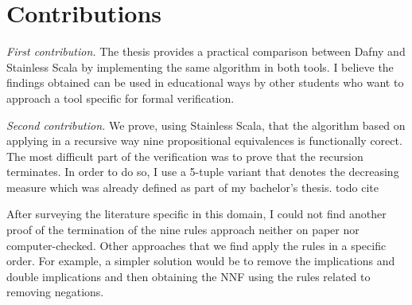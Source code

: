 \chapter*{Contributions} 

\emph{First contribution.} The thesis provides a practical comparison between Dafny and Stainless Scala
by implementing the same algorithm in both tools. I believe the findings obtained can be used in educational 
ways by other students who want to approach a tool specific for formal verification.

\emph{Second contribution.} We prove, using Stainless Scala, that the algorithm based on applying 
in a recursive way nine propositional equivalences is functionally corect. The most difficult part
of the verification was to prove that the recursion terminates. In order to do so, I use a 5-tuple
variant that denotes the decreasing measure which was already defined as part of my bachelor's thesis. todo cite

After surveying the literature specific in this domain, I could not find another proof of the termination
of the nine rules approach neither on paper nor computer-checked. Other approaches that we find apply
the rules in a specific order. For example, a simpler solution would be to remove the implications and 
double implications and then obtaining the NNF using the rules related to removing negations.
